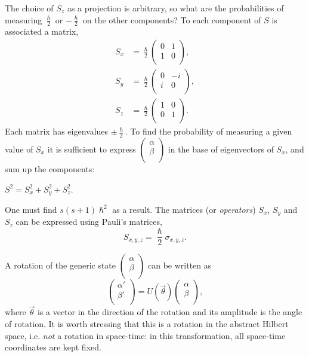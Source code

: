 The choice of $S_{z}$ as a projection is arbitrary, so what are the probabilities of measuring $\frac{\hslash}{2}$ or $-\frac{\hslash}{2}$ on the other components? To each component of \(S\) is associated a matrix,
\begin{align*}
S_x &=\frac{ \hslash}{2}  \begin{pmatrix} 0& 1\\ 1&0\\
\end{pmatrix},\\
S_y &=\frac{ \hslash}{2}  \begin{pmatrix} 0& -i\\ i&0\\
\end{pmatrix},\\
S_z &=\frac{ \hslash}{2}  \begin{pmatrix} 1& 0\\ 0&1\\
\end{pmatrix}.
\end{align*}
Each matrix has eigenvalues $\pm \frac{ \hslash}{2}$. To find the probability of measuring a given value of $S_x$ it is sufficient to express $\begin{pmatrix} \alpha \\ \beta \\
\end{pmatrix}$ in the base of eigenvectors of $S_x$, and sum up the components:\par
\begin{center}
    $S^2=S_x^2+S_y^2+S_z^2$.
\end{center}
One must find $s(s+1)\hslash^2$ as a result.
The matrices (or \emph{operators}) $S_x$, $S_y$ and $S_z$ can be expressed using Pauli's matrices,
\[S_{x,y,z}=\frac{\hslash}{2}\sigma_{x,y,z}.\]

A rotation of the generic state $\begin{pmatrix} \alpha \\ \beta \\ 
\end{pmatrix}$ can be written as 
\[
\begin{pmatrix} \alpha' \\ \beta' \\ 
\end{pmatrix}=U(\vec{\theta})\begin{pmatrix} \alpha \\ \beta \\ 
\end{pmatrix},
\]
where $\vec{\theta}$ is a vector in the direction of the rotation and its amplitude is the angle of rotation. It is worth stressing that this is a rotation in the abstract Hilbert space, i.e. \emph{not} a rotation in space-time: in this transformation, all space-time coordinates are kept fixed.

